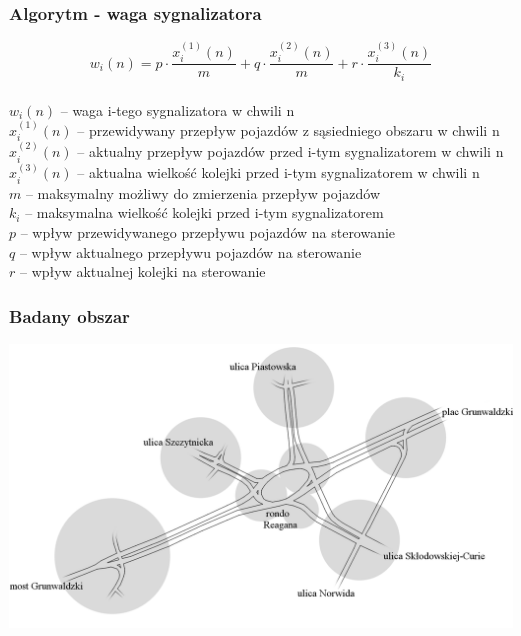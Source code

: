 \documentclass[17pt]{beamer}
\begin{document}
\begin{frame}[shrink=5]
  \frametitle{\vspace{22px}Algorytm - waga sygnalizatora}
  $$w_{i} (n) = p \cdot \frac{x^{(1)}_{i} (n)}{m} + q \cdot \frac{x^{(2)}_{i} (n)}{m} + r \cdot \frac{x^{(3)}_{i} (n)}{k_{i}}$$\\
  \tiny{
  $w_{i} (n)$ -- waga i-tego sygnalizatora w chwili n\\
  $x^{(1)}_{i} (n)$ -- przewidywany przepływ pojazdów z sąsiedniego obszaru w chwili n\\
  $x^{(2)}_{i} (n)$ -- aktualny przepływ pojazdów przed i-tym sygnalizatorem w chwili n\\
  $x^{(3)}_{i} (n)$ -- aktualna wielkość kolejki przed i-tym sygnalizatorem w chwili n\\
  $m$ -- maksymalny możliwy do zmierzenia przepływ pojazdów\\
  $k_{i}$ -- maksymalna wielkość kolejki przed i-tym sygnalizatorem\\
  $p$ -- wpływ przewidywanego przepływu pojazdów na sterowanie\\
  $q$ -- wpływ aktualnego przepływu pojazdów na sterowanie\\
  $r$ -- wpływ aktualnej kolejki na sterowanie\\
  }
\end{frame}

\begin{frame}[shrink=5]
  \frametitle{\vspace{22px}Badany obszar}
  \includegraphics[width=1.0\textwidth]{mapa_czysta.png}
\end{frame}
\end{document}
